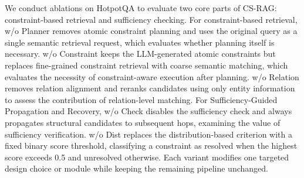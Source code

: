 \documentclass{article}
\theoremstyle{plain}
\theoremstyle{definition}
\theoremstyle{remark}
\begin{document}
We conduct ablations on HotpotQA to evaluate two core parts of CS-RAG: constraint-based retrieval and sufficiency checking. For constraint-based retrieval, w/o Planner removes atomic constraint planning and uses the original query as a single semantic retrieval request, which evaluates whether planning itself is necessary. 
w/o Constraint keeps the LLM-generated atomic constraints but replaces fine-grained constraint retrieval with coarse semantic matching, which evaluates the necessity of constraint-aware execution after planning. w/o Relation removes relation alignment and reranks candidates using only entity information to assess the contribution of relation-level matching. 
For Sufficiency-Guided Propagation and Recovery, w/o Check disables the sufficiency check and always propagates structural candidates to subsequent hops, examining the value of sufficiency verification. 
w/o Dist replaces the distribution-based criterion with a fixed binary score threshold, classifying a constraint as resolved when the highest score exceeds 0.5 and unresolved otherwise. Each variant modifies one targeted design choice or module while keeping the remaining pipeline unchanged.



\end{document}
